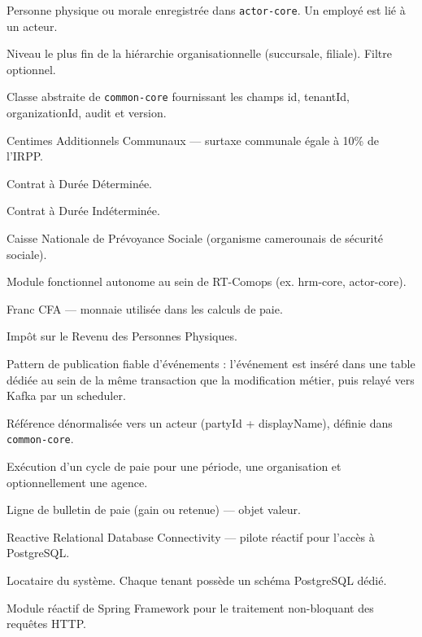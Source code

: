 \documentclass[a4paper,12pt,openany]{book}
\begin{document}
    \begin{description}[style=nextline, leftmargin=4cm]
  \item[Actor] Personne physique ou morale enregistrée dans \texttt{actor-core}. Un employé est lié à un acteur.
  \item[Agence] Niveau le plus fin de la hiérarchie organisationnelle (succursale, filiale). Filtre optionnel.
  \item[BaseEntity] Classe abstraite de \texttt{common-core} fournissant les champs id, tenantId, organizationId, audit et version.
  \item[CAC] Centimes Additionnels Communaux — surtaxe communale égale à 10\% de l'IRPP.
  \item[CDD] Contrat à Durée Déterminée.
  \item[CDI] Contrat à Durée Indéterminée.
  \item[CNPS] Caisse Nationale de Prévoyance Sociale (organisme camerounais de sécurité sociale).
  \item[Core] Module fonctionnel autonome au sein de RT-Comops (ex. hrm-core, actor-core).
  \item[FCFA] Franc CFA — monnaie utilisée dans les calculs de paie.
  \item[IRPP] Impôt sur le Revenu des Personnes Physiques.
  \item[Outbox] Pattern de publication fiable d'événements : l'événement est inséré dans une table dédiée au sein de la même transaction que la modification métier, puis relayé vers Kafka par un scheduler.
  \item[PartyRef] Référence dénormalisée vers un acteur (partyId + displayName), définie dans \texttt{common-core}.
  \item[PayrollRun] Exécution d'un cycle de paie pour une période, une organisation et optionnellement une agence.
  \item[PayslipLine] Ligne de bulletin de paie (gain ou retenue) — objet valeur.
  \item[R2DBC] Reactive Relational Database Connectivity — pilote réactif pour l'accès à PostgreSQL.
  \item[Tenant] Locataire du système. Chaque tenant possède un schéma PostgreSQL dédié.
  \item[WebFlux] Module réactif de Spring Framework pour le traitement non-bloquant des requêtes HTTP.
    \end{description}

\end{document}

